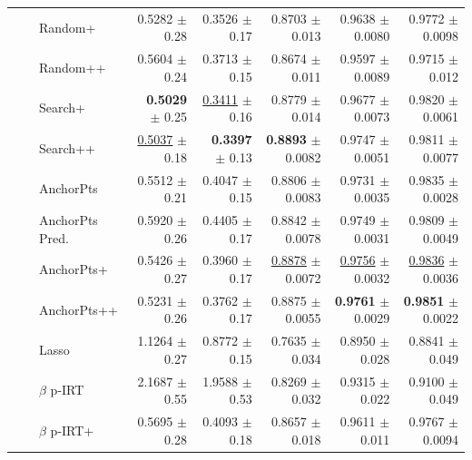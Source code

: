 \begin{longtable}{llp{}rrrrr}
 &  & Random+ & 0.5282 {\scriptsize $\pm$ 0.28} & 0.3526 {\scriptsize $\pm$ 0.17} & 0.8703 {\scriptsize $\pm$ 0.013} & 0.9638 {\scriptsize $\pm$ 0.0080} & 0.9772 {\scriptsize $\pm$ 0.0098} \\
 &  & Random++ & 0.5604 {\scriptsize $\pm$ 0.24} & 0.3713 {\scriptsize $\pm$ 0.15} & 0.8674 {\scriptsize $\pm$ 0.011} & 0.9597 {\scriptsize $\pm$ 0.0089} & 0.9715 {\scriptsize $\pm$ 0.012} \\
 &  & Search+ & \textbf{0.5029} {\scriptsize $\pm$ 0.25} & \underline{0.3411} {\scriptsize $\pm$ 0.16} & 0.8779 {\scriptsize $\pm$ 0.014} & 0.9677 {\scriptsize $\pm$ 0.0073} & 0.9820 {\scriptsize $\pm$ 0.0061} \\
 &  & Search++ & \underline{0.5037} {\scriptsize $\pm$ 0.18} & \textbf{0.3397} {\scriptsize $\pm$ 0.13} & \textbf{0.8893} {\scriptsize $\pm$ 0.0082} & 0.9747 {\scriptsize $\pm$ 0.0051} & 0.9811 {\scriptsize $\pm$ 0.0077} \\
 &  & AnchorPts & 0.5512 {\scriptsize $\pm$ 0.21} & 0.4047 {\scriptsize $\pm$ 0.15} & 0.8806 {\scriptsize $\pm$ 0.0083} & 0.9731 {\scriptsize $\pm$ 0.0035} & 0.9835 {\scriptsize $\pm$ 0.0028} \\
 &  & AnchorPts Pred. & 0.5920 {\scriptsize $\pm$ 0.26} & 0.4405 {\scriptsize $\pm$ 0.17} & 0.8842 {\scriptsize $\pm$ 0.0078} & 0.9749 {\scriptsize $\pm$ 0.0031} & 0.9809 {\scriptsize $\pm$ 0.0049} \\
 &  & AnchorPts+ & 0.5426 {\scriptsize $\pm$ 0.27} & 0.3960 {\scriptsize $\pm$ 0.17} & \underline{0.8878} {\scriptsize $\pm$ 0.0072} & \underline{0.9756} {\scriptsize $\pm$ 0.0032} & \underline{0.9836} {\scriptsize $\pm$ 0.0036} \\
 &  & AnchorPts++ & 0.5231 {\scriptsize $\pm$ 0.26} & 0.3762 {\scriptsize $\pm$ 0.17} & 0.8875 {\scriptsize $\pm$ 0.0055} & \textbf{0.9761} {\scriptsize $\pm$ 0.0029} & \textbf{0.9851} {\scriptsize $\pm$ 0.0022} \\
 &  & Lasso & 1.1264 {\scriptsize $\pm$ 0.27} & 0.8772 {\scriptsize $\pm$ 0.15} & 0.7635 {\scriptsize $\pm$ 0.034} & 0.8950 {\scriptsize $\pm$ 0.028} & 0.8841 {\scriptsize $\pm$ 0.049} \\
 &  & $\beta$ p-IRT & 2.1687 {\scriptsize $\pm$ 0.55} & 1.9588 {\scriptsize $\pm$ 0.53} & 0.8269 {\scriptsize $\pm$ 0.032} & 0.9315 {\scriptsize $\pm$ 0.022} & 0.9100 {\scriptsize $\pm$ 0.049} \\
 &  & $\beta$ p-IRT+ & 0.5695 {\scriptsize $\pm$ 0.28} & 0.4093 {\scriptsize $\pm$ 0.18} & 0.8657 {\scriptsize $\pm$ 0.018} & 0.9611 {\scriptsize $\pm$ 0.011} & 0.9767 {\scriptsize $\pm$ 0.0094} \\

\end{longtable}
